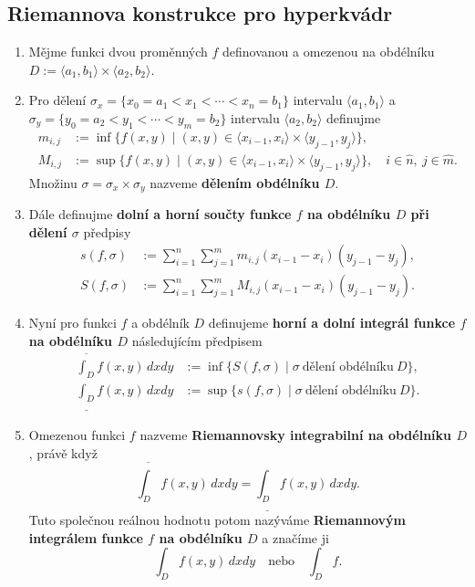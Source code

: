 \subsection*{Riemannova konstrukce pro hyperkvádr}

\begin{enumerate}
    \item Mějme funkci dvou proměnných $f$ definovanou a omezenou na obdélníku $D :=
              \langle a_1, b_1 \rangle \times \langle a_2, b_2 \rangle$.
    \item Pro dělení $\sigma_x = \{x_0 = a_1 < x_1 < \cdots < x_n = b_1\}$ intervalu
          $\langle a_1, b_1 \rangle$ a $\sigma_y = \{y_0 = a_2 < y_1 < \cdots < y_m = b_2
              \}$ intervalu $\langle a_2, b_2 \rangle$ definujme
          \begin{align*}
              m_{i,j} & := \inf \{ f(x,y) \mid (x,y) \in \langle x_{i-1}, x_{i} \rangle \times \langle y_{j-1}, y_j \rangle\},                                      \\
              M_{i,j} & := \sup \{ f(x,y) \mid (x,y) \in \langle x_{i-1}, x_{i} \rangle \times \langle y_{j-1}, y_j \rangle\},  \quad i \in \hat n, \ j \in \hat m.
          \end{align*}
          Množinu $\sigma = \sigma_x \times \sigma_y$ nazveme \textbf{dělením obdélníku $D$}.
    \item Dále definujme \textbf{dolní a horní součty funkce $f$ na obdélníku $D$ při
              dělení $\sigma$} předpisy
          \begin{align*}
              s(f, \sigma) & := \sum_{i=1}^n \sum_{j=1}^m m_{i,j} (x_{i-1} - x_i)(y_{j-1} -
              y_j),                                                                         \\ S(f, \sigma) & := \sum_{i=1}^n \sum_{j=1}^m M_{i,j} (x_{i-1} -
                 x_i)(y_{j-1} - y_j).
          \end{align*}
    \item Nyní pro funkci $f$ a obdélník $D$ definujeme \textbf{horní a dolní integrál
              funkce $f$ na obdélníku $D$} následujícím předpisem
          \begin{align*}
              \overline{\int_D} f(x,y)\,dxdy  & := \inf\{ S(f, \sigma) \mid \sigma \ \text{dělení obdélníku} \ D \}, \\
              \underline{\int_D} f(x,y)\,dxdy & := \sup\{ s(f, \sigma) \mid \sigma \ \text{dělení obdélníku} \ D \}.
          \end{align*}
    \item Omezenou funkci $f$ nazveme \textbf{Riemannovsky integrabilní na obdélníku
              $D$}, právě když
          \[ \overline{\int_D} f(x,y) \,dxdy = \underline{\int_D} f(x,y) \,dxdy. \]
          Tuto společnou reálnou hodnotu potom nazýváme \textbf{Riemannovým integrálem
              funkce $f$ na obdélníku $D$} a značíme ji
          \[ \int_D f(x,y)\,dxdy \quad \text{nebo} \quad \int_D f. \]
\end{enumerate}

